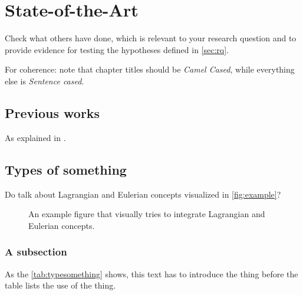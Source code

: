 \chapter{State-of-the-Art}
\label{ch:soa}


Check what others have done, which is relevant to your research question and to provide evidence for testing the hypotheses defined in \autoref{sec:rq}.

For coherence: note that chapter titles should be \textit{Camel Cased}, while everything else is \textit{Sentence cased}.

\section{Previous works}
\label{sec:prevworks}
	
As explained in .
	
	
\section{Types of something}
\label{sec:typesome}

Do  talk about Lagrangian and Eulerian concepts visualized in \autoref{fig:example}?

\begin{figure}[htp]
	\begin{center}
		\begin{minipage}{\textwidth}
			\centering
			\caption[An example figure.]{An example figure that visually tries to integrate Lagrangian and Eulerian concepts.}
			\label{fig:example}
		\end{minipage}
	\end{center}
\end{figure}

		
\subsection{A subsection}
\label{subsec:somesome}
		
As the \autoref{tab:typesomething} shows, this text has to introduce the thing before the table lists the use of the thing.
		
